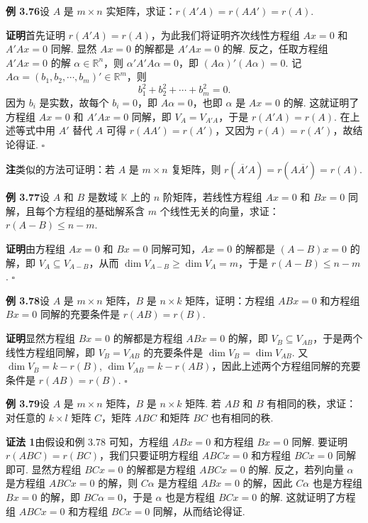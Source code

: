 \documentclass[UTF8, 12pt, fontset=fandol, oneside]{ctexart}
\begin{document}
\noindent\textbf{例 3.76}\quad 设 $A$ 是 $m\times n$ 实矩阵，求证：$r(A'A)=r(AA')=r(A)$.

\noindent\textbf{证明}\quad 首先证明 $r(A'A)=r(A)$，为此我们将证明齐次线性方程组 $Ax=0$ 和 $A'Ax=0$ 同解. 显然 $Ax=0$ 的解都是 $A'Ax=0$ 的解. 反之，任取方程组 $A'Ax=0$ 的解 $\alpha\in\mathbb{R}^n$，则 $\alpha'A'A\alpha=0$，即 $(A\alpha)'(A\alpha)=0$. 记 $A\alpha=(b_1,b_2,\cdots,b_m)'\in\mathbb{R}^m$，则
\[
b_1^2+b_2^2+\cdots+b_m^2=0.
\]
因为 $b_i$ 是实数，故每个 $b_i=0$，即 $A\alpha=0$，也即 $\alpha$ 是 $Ax=0$ 的解. 这就证明了方程组 $Ax=0$ 和 $A'Ax=0$ 同解，即 $V_A=V_{A'A}$，于是 $r(A'A)=r(A)$. 在上述等式中用 $A'$ 替代 $A$ 可得 $r(AA')=r(A')$，又因为 $r(A)=r(A')$，故结论得证. $\square$

\noindent\textbf{注}\quad 类似的方法可证明：若 $A$ 是 $m\times n$ 复矩阵，则 $r(\overline{A'}A)=r(A\overline{A'})=r(A)$.

\noindent\textbf{例 3.77}\quad 设 $A$ 和 $B$ 是数域 $\mathbb{K}$ 上的 $n$ 阶矩阵，若线性方程组 $Ax=0$ 和 $Bx=0$ 同解，且每个方程组的基础解系含 $m$ 个线性无关的向量，求证：$r(A-B)\le n-m$.

\noindent\textbf{证明}\quad 由方程组 $Ax=0$ 和 $Bx=0$ 同解可知，$Ax=0$ 的解都是 $(A-B)x=0$ 的解，即 $V_A\subseteq V_{A-B}$，从而 $\dim V_{A-B}\ge \dim V_A=m$，于是 $r(A-B)\le n-m$. $\square$

\noindent\textbf{例 3.78}\quad 设 $A$ 是 $m\times n$ 矩阵，$B$ 是 $n\times k$ 矩阵，证明：方程组 $ABx=0$ 和方程组 $Bx=0$ 同解的充要条件是 $r(AB)=r(B)$.

\noindent\textbf{证明}\quad 显然方程组 $Bx=0$ 的解都是方程组 $ABx=0$ 的解，即 $V_B\subseteq V_{AB}$，于是两个线性方程组同解，即 $V_B=V_{AB}$ 的充要条件是 $\dim V_B=\dim V_{AB}$. 又 $\dim V_B=k-r(B)$, $\dim V_{AB}=k-r(AB)$，因此上述两个方程组同解的充要条件是 $r(AB)=r(B)$. $\square$

\noindent\textbf{例 3.79}\quad 设 $A$ 是 $m\times n$ 矩阵，$B$ 是 $n\times k$ 矩阵. 若 $AB$ 和 $B$ 有相同的秩，求证：对任意的 $k\times l$ 矩阵 $C$，矩阵 $ABC$ 和矩阵 $BC$ 也有相同的秩.

\noindent\textbf{证法 1}\quad 由假设和例 3.78 可知，方程组 $ABx=0$ 和方程组 $Bx=0$ 同解. 要证明 $r(ABC)=r(BC)$，我们只要证明方程组 $ABCx=0$ 和方程组 $BCx=0$ 同解即可. 显然方程组 $BCx=0$ 的解都是方程组 $ABCx=0$ 的解. 反之，若列向量 $\alpha$ 是方程组 $ABCx=0$ 的解，则 $C\alpha$ 是方程组 $ABx=0$ 的解，因此 $C\alpha$ 也是方程组 $Bx=0$ 的解，即 $BC\alpha=0$，于是 $\alpha$ 也是方程组 $BCx=0$ 的解. 这就证明了方程组 $ABCx=0$ 和方程组 $BCx=0$ 同解，从而结论得证.
\end{document}
